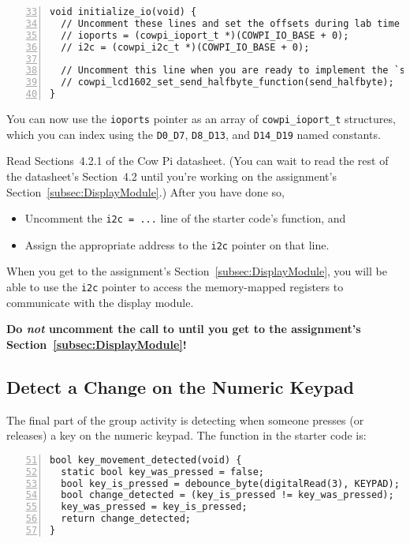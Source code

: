 \begin{lstlisting}[numberstyle=\color{gray}, numbers=left, firstnumber=33]
void initialize_io(void) {
  // Uncomment these lines and set the offsets during lab time
  // ioports = (cowpi_ioport_t *)(COWPI_IO_BASE + 0);
  // i2c = (cowpi_i2c_t *)(COWPI_IO_BASE + 0);

  // Uncomment this line when you are ready to implement the `send_halfbyte()` function
  // cowpi_lcd1602_set_send_halfbyte_function(send_halfbyte);
}
\end{lstlisting}

You can now use the \lstinline{ioports} pointer as an array of \lstinline{cowpi_ioport_t} structures, which you can index using the \lstinline{D0_D7}, \lstinline{D8_D13}, and \lstinline{D14_D19} named constants.

Read Sections~4.2.1 of the Cow Pi datasheet.
(You can wait to read the rest of the datasheet's Section~4.2 until you're working on the assignment's Section~\ref{subsec:DisplayModule}.)
After you have done so,
\begin{itemize}
    \item Uncomment the \lstinline{i2c = ...} line of the starter code's  function, and
    \item Assign the appropriate address to the \lstinline{i2c} pointer on that line.
\end{itemize}

When you get to the assignment's Section~\ref{subsec:DisplayModule}, you will be able to use the \lstinline{i2c} pointer to access the memory-mapped registers to communicate with the display module.

\textbf{Do \textit{not} uncomment the call to  until you get to the assignment's Section~\ref{subsec:DisplayModule}!}


\subsection{Detect a Change on the Numeric Keypad}

The final part of the group activity is detecting when someone presses (or releases) a key on the numeric keypad.
The  function in the starter code is:

\begin{lstlisting}[numberstyle=\color{gray}, numbers=left, firstnumber=51, escapechar=`]
bool key_movement_detected(void) {
  static bool key_was_pressed = false;
  bool key_is_pressed = debounce_byte(digitalRead(3), KEYPAD);  `\label{code:readNAND}`
  bool change_detected = (key_is_pressed != key_was_pressed);
  key_was_pressed = key_is_pressed;
  return change_detected;
}
\end{lstlisting}

